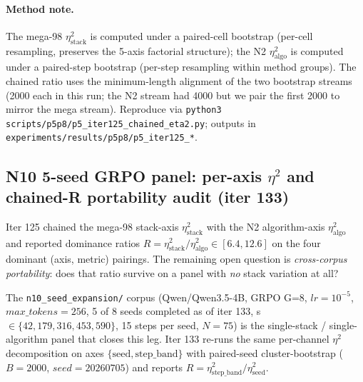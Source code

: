 \documentclass{article}  \usepackage[preprint,nonatbib]{neurips_2026} \usepackage[numbers]{natbib}
\begin{document}
\paragraph{Method note.} The mega-98 $\eta^2_{\mathrm{stack}}$ is
computed under a paired-cell bootstrap (per-cell resampling,
preserves the 5-axis factorial structure); the N2
$\eta^2_{\mathrm{algo}}$ is computed under a paired-step bootstrap
(per-step resampling within method groups). The chained ratio uses
the minimum-length alignment of the two bootstrap streams (2000 each
in this run; the N2 stream had 4000 but we pair the first 2000 to
mirror the mega stream). Reproduce via
\texttt{python3 scripts/p5p8/p5\_iter125\_chained\_eta2.py}; outputs
in \texttt{experiments/results/p5p8/p5\_iter125\_*}.

 \subsection{N10 5-seed GRPO panel: per-axis $\eta^2$ and chained-R portability audit (iter 133)}
\label{sec:p5-iter133-n10-eta2}

Iter 125 chained the mega-98 stack-axis $\eta^2_{\mathrm{stack}}$ with the
N2 algorithm-axis $\eta^2_{\mathrm{algo}}$ and reported dominance ratios
$R = \eta^2_{\mathrm{stack}} / \eta^2_{\mathrm{algo}} \in [6.4, 12.6]$ on
the four dominant (axis, metric) pairings. The remaining open question is
\emph{cross-corpus portability}: does that ratio survive on a panel with
\emph{no} stack variation at all?

The \texttt{n10\_seed\_expansion/} corpus (Qwen/Qwen3.5-4B, GRPO G=8,
$lr=10^{-5}$, $max\_tokens=256$, 5 of 8 seeds completed as of iter 133,
s$\in\{42,179,316,453,590\}$, 15 steps per seed, $N=75$) is the
single-stack / single-algorithm panel that closes this leg. Iter 133
re-runs the same per-channel $\eta^2$ decomposition on axes
$\{\mathrm{seed}, \mathrm{step\_band}\}$ with paired-seed cluster-bootstrap
($B=2000$, $seed=20260705$) and reports $R = \eta^2_{\mathrm{step\_band}} / \eta^2_{\mathrm{seed}}$.
\end{document}
